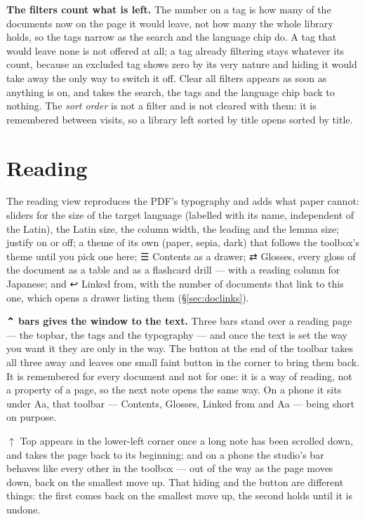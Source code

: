 \documentclass[11pt,oneside]{report}
\newcommand{\sym}[1]{{\symfont #1}}
\newcommand{\menu}[1]{\textsf{#1}}
\begin{document}
\textbf{The filters count what is left.} The number on a tag is how many of
the documents now on the page it would leave, not how many the whole library
holds, so the tags narrow as the search and the language chip do. A tag that
would leave none is not offered at all; a tag already filtering stays
whatever its count, because an excluded tag shows zero by its very nature and
hiding it would take away the only way to switch it off. \menu{Clear all
filters} appears as soon as anything is on, and takes the search, the tags
and the language chip back to nothing. The \emph{sort order} is not a filter
and is not cleared with them: it is remembered between visits, so a library
left sorted by title opens sorted by title.

\section{Reading}

The reading view reproduces the PDF's typography and adds what paper
cannot: sliders for the size of the target language (labelled with its
name, independent of the Latin), the Latin size, the column width, the
leading and the lemma size; justify on or off; a theme of its own (paper,
sepia, dark) that follows the toolbox's theme until you pick one here;
\menu{\sym{☰} Contents} as a drawer; \menu{\sym{⇄} Glosses}, every gloss of
the document as a table and as a flashcard drill --- with a reading column
for Japanese; and \menu{\sym{↩} Linked from}, with the number of documents
that link to this one, which opens a drawer listing them
(\S\ref{sec:doclinks}).

\textbf{\menu{\sym{⌃} bars} gives the window to the text.} Three bars stand
over a reading page --- the topbar, the tags and the typography --- and once
the text is set the way you want it they are only in the way. The button at
the end of the toolbar takes all three away and leaves one small faint button
in the corner to bring them back. It is remembered for every document and not
for one: it is a way of reading, not a property of a page, so the next note
opens the same way. On a phone it sits under \menu{Aa}, that toolbar ---
\menu{Contents}, \menu{Glosses}, \menu{Linked from} and \menu{Aa} --- being
short on purpose.

\menu{$\uparrow$ Top} appears in the lower-left corner once a long note has
been scrolled down, and takes the page back to its beginning; and on a phone
the studio's bar behaves like every other in the toolbox --- out of the way
as the page moves down, back on the smallest move up. That hiding and the
button are different things: the first comes back on the smallest move up,
the second holds until it is undone.
\end{document}
